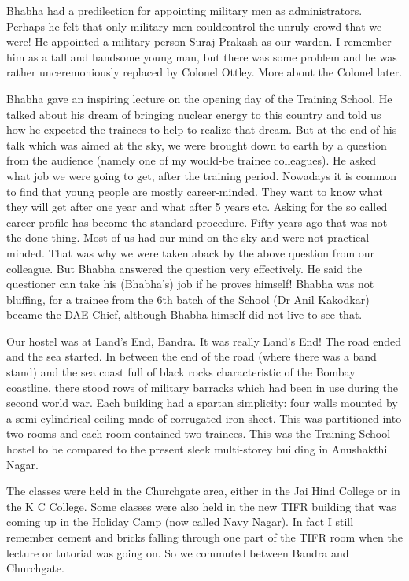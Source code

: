 Bhabha had a predilection for appointing military men as admini\-strators. Perhaps he felt that only military men could\break control the unruly crowd that we were! He appointed a military person Suraj Prakash as our warden. I remember him as a tall and handsome young man, but there was some problem and he was rather unceremoniously replaced by Colonel Ottley. More about the Colonel later.

Bhabha gave an inspiring lecture on the opening day of the Training School. He talked about his dream of bringing nuclear energy to this country and told us how he expected the trainees to help to realize that dream. But at the end of his talk which was aimed at the sky, we were brought down to earth by a question from the audience (namely  one of my would-be trainee collea\-gues). He asked what job we were going to get, after the training period. Nowadays it is common to find that young people are mostly career-minded. They want to know what they will get after one year and what after 5 years etc. Asking for the so called career-profile has become the standard procedure. Fifty years ago that was not the done thing. Most of us had our mind on the sky and were not practical-minded. That was why we were taken aback by the above question from our colleague. But  Bhabha answered the question very effectively. He said the questioner can take his (Bhabha's) job if he proves himself! Bhabha was not bluffing, for a trainee from the 6th batch of the School (Dr Anil Kakodkar) became the DAE Chief, although Bhabha himself did not live to see that.
\newpage

Our hostel was at Land's End, Bandra. It was really Land's End! The road ended and the sea started. In between the end of the road (where there was a band stand) and the sea coast full of black rocks characteristic of the Bombay coastline, there stood rows of military barracks which had been in use during the second world war. Each building had a spartan simplicity: four walls mounted by a semi-cylindrical ceiling made of corrugated iron sheet. This was partitioned into two rooms and each room contained two trainees. This was the Training School hostel to be compared to the present sleek multi-storey building in Anushakthi Nagar.

The classes were held in the Churchgate area, either in the Jai Hind College or in the K C College. Some classes were also held in the new TIFR building that was coming up in the Holiday Camp (now called Navy Nagar). In fact I still remember cement and bricks falling through one part of the TIFR room when the lecture or tutorial was going on. So we commuted between Bandra and Churchgate.
\smallskip


